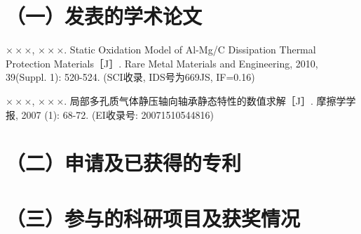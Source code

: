 \publication

\section*{（一）发表的学术论文}
\begin{listSquare}
  \item {\Large$\times \times \times$, $\times \times \times$}. 
    Static Oxidation Model of Al-Mg/C Dissipation Thermal Protection 
    Materials［J］. Rare Metal Materials and Engineering,
    2010, 39(Suppl. 1): 520-524. (SCI收录, IDS号为669JS, IF=0.16)
  \item {\Large$\times \times \times$, $\times \times \times$}. 
    局部多孔质气体静压轴向轴承静态特性的数值求解［J］.
    摩擦学学报, 2007 (1): 68-72. (EI收录号: 20071510544816)
\end{listSquare}

\section*{（二）申请及已获得的专利}

\section*{（三）参与的科研项目及获奖情况}


